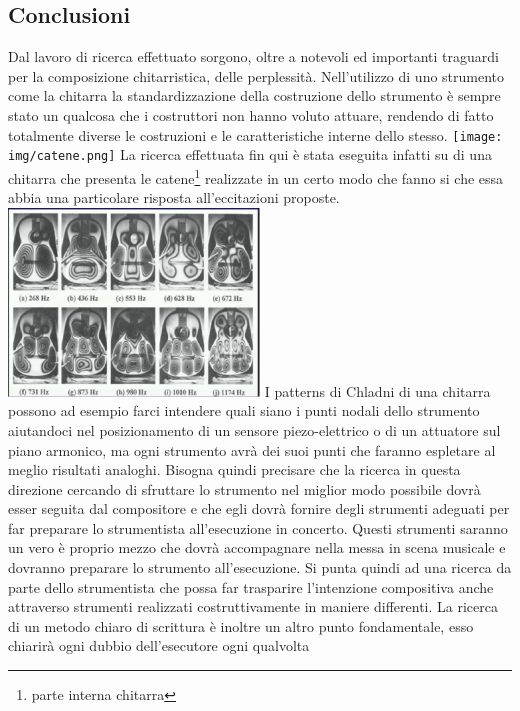 \documentclass[oneside]{article}
\begin{document}
\begin{multicols*}{2}

\section{Conclusioni}

Dal lavoro di ricerca effettuato sorgono, oltre a notevoli ed importanti traguardi per la composizione chitarristica, delle perplessità. Nell’utilizzo di uno strumento come la chitarra la standardizzazione della costruzione dello strumento è sempre stato un qualcosa che i costruttori non hanno voluto attuare, rendendo di fatto totalmente diverse le costruzioni e le caratteristiche interne dello stesso.
\texttt{[image: img/catene.png]}
La ricerca effettuata fin qui è stata eseguita infatti su di una chitarra che presenta le catene\footnote{parte interna chitarra} realizzate in un certo modo che fanno si che essa abbia una particolare risposta all’eccitazioni proposte.
\includegraphics[width=0.5\textwidth]{img/chladni1.png}
I patterns di Chladni  di una chitarra possono ad esempio farci intendere quali siano i punti nodali dello strumento aiutandoci nel posizionamento di un sensore piezo-elettrico o di un attuatore sul piano armonico, ma ogni strumento avrà dei suoi punti che faranno espletare al meglio risultati analoghi. Bisogna quindi precisare che la ricerca in questa direzione cercando di sfruttare lo strumento nel miglior modo possibile dovrà esser seguita dal compositore e che egli dovrà fornire degli strumenti adeguati per far preparare lo strumentista all'esecuzione in concerto. Questi strumenti saranno un vero è proprio mezzo che dovrà accompagnare nella messa in scena musicale e dovranno preparare lo strumento all'esecuzione. Si punta quindi ad una ricerca da parte dello strumentista che possa far trasparire l'intenzione compositiva anche attraverso strumenti realizzati costruttivamente in maniere differenti.
La ricerca di un metodo chiaro di scrittura è inoltre un altro punto fondamentale, esso chiarirà ogni dubbio dell'esecutore ogni qualvolta 


\end{multicols*}
\end{document}
